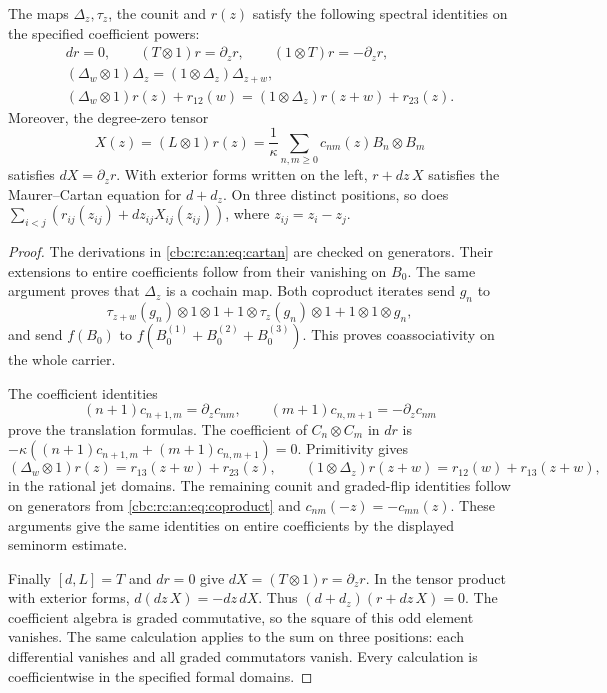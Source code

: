 \begin{proposition}\label{cbc:rc:an:prop:spectral}
The maps \(\Delta_z,\tau_z\), the counit and \(r(z)\) satisfy the
following spectral identities on the specified coefficient powers:
\begin{gather*}
 dr=0,\qquad (T\otimes1)r=\partial_zr,
 \qquad (1\otimes T)r=-\partial_zr,\\
 (\Delta_w\otimes1)\Delta_z=(1\otimes\Delta_z)\Delta_{z+w},\\
 (\Delta_w\otimes1)r(z)+r_{12}(w)
   =(1\otimes\Delta_z)r(z+w)+r_{23}(z).
\end{gather*}
Moreover, the degree-zero tensor
\begin{equation}\label{cbc:rc:an:eq:connection}
 X(z)=(L\otimes1)r(z)
       =\frac1\kappa\sum_{n,m\geq0}c_{nm}(z)
                                 B_n\otimes B_m
\end{equation}
satisfies \(dX=\partial_zr\). With exterior forms written on the
left, \(r+dz\,X\) satisfies the Maurer--Cartan equation for
\(d+d_z\). On three distinct positions, so does
\(\sum_{i<j}(r_{ij}(z_{ij})+dz_{ij}X_{ij}(z_{ij}))\), where
\(z_{ij}=z_i-z_j\).
\end{proposition}
\begin{proof}
The derivations in \eqref{cbc:rc:an:eq:cartan} are checked on generators.
Their extensions to entire coefficients follow from their vanishing
on \(B_0\). The same argument proves that \(\Delta_z\) is a
cochain map. Both coproduct iterates send \(g_n\) to
\[
 \tau_{z+w}(g_n)\otimes1\otimes1
 +1\otimes\tau_z(g_n)\otimes1
 +1\otimes1\otimes g_n,
\]
and send \(f(B_0)\) to \(f(B_0^{(1)}+B_0^{(2)}+
B_0^{(3)})\). This proves coassociativity on the whole carrier.

The coefficient identities
\[
 (n+1)c_{n+1,m}=\partial_zc_{nm},\qquad
 (m+1)c_{n,m+1}=-\partial_zc_{nm}
\]
prove the translation formulas. The coefficient of
\(C_n\otimes C_m\) in \(dr\) is
\(-\kappa((n+1)c_{n+1,m}+(m+1)c_{n,m+1})=0\).
Primitivity gives
\[
 (\Delta_w\otimes1)r(z)=r_{13}(z+w)+r_{23}(z),\qquad
 (1\otimes\Delta_z)r(z+w)=r_{12}(w)+r_{13}(z+w),
\]
in the rational jet domains. The remaining counit and graded-flip
identities follow on generators from \eqref{cbc:rc:an:eq:coproduct} and
\(c_{nm}(-z)=-c_{mn}(z)\). These arguments give the same identities
on entire coefficients by the displayed seminorm estimate.

Finally \([d,L]=T\) and \(dr=0\) give
\(dX=(T\otimes1)r=\partial_zr\). In the tensor product with
exterior forms, \(d(dz\,X)=-dz\,dX\). Thus
\((d+d_z)(r+dz\,X)=0\). The coefficient algebra is graded
commutative, so the square of this odd element vanishes. The same
calculation applies to the sum on three positions: each differential
vanishes and all graded commutators vanish. Every calculation is
coefficientwise in the specified formal domains.
\end{proof}

